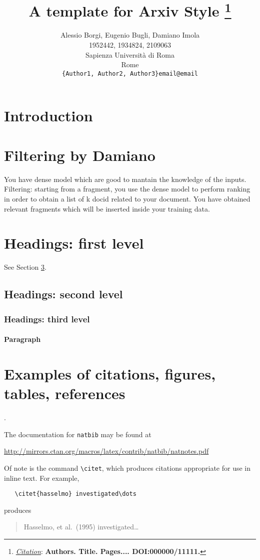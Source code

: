\documentclass{article}
\title{A template for Arxiv Style
\thanks{\textit{\underline{Citation}}: 
\textbf{Authors. Title. Pages.... DOI:000000/11111.}} 
}
\author{
  Alessio Borgi, Eugenio Bugli, Damiano Imola \\
  1952442, 1934824, 2109063 \\
  Sapienza Università di Roma \\
  Rome\\
  \texttt{\{Author1, Author2, Author3\}email@email} \\
}
\begin{document}
\maketitle


\begin{abstract}
\end{abstract}




\section{Introduction}
\section{Filtering by Damiano}
You have dense model which are good to mantain the knowledge of the inputs.
Filtering: starting from a fragment, you use the dense model to perform ranking in order to obtain a list of k docid related to your document. You have obtained relevant fragments which will be inserted inside your training data.

\section{Headings: first level}
\label{sec:headings}
See Section \ref{sec:headings}.

\subsection{Headings: second level}

\subsubsection{Headings: third level}

\paragraph{Paragraph}

\section{Examples of citations, figures, tables, references}
\label{sec:others}
\cite{pyserini}.

The documentation for \verb+natbib+ may be found at
\begin{center}
  \url{http://mirrors.ctan.org/macros/latex/contrib/natbib/natnotes.pdf}
\end{center}
Of note is the command \verb+\citet+, which produces citations
appropriate for use in inline text.  For example,
\begin{verbatim}
   \citet{hasselmo} investigated\dots
\end{verbatim}
produces
\begin{quote}
  Hasselmo, et al.\ (1995) investigated\dots
\end{quote}
\end{document}
